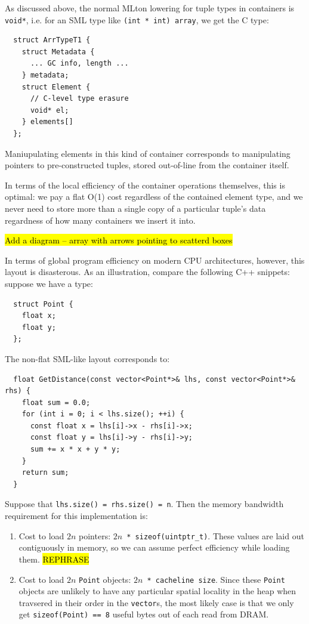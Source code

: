 \documentclass[leqno,11pt]{article}
\begin{document}
As discussed above, the normal MLton lowering for tuple types in containers is
\texttt{void*}, i.e. for an SML type like \texttt{(int * int) array}, we get the
C type:
\begin{verbatim}
  struct ArrTypeT1 {
    struct Metadata {
      ... GC info, length ...
    } metadata;
    struct Element {
      // C-level type erasure
      void* el;
    } elements[]
  };
\end{verbatim}
Maniupulating elements in this kind of container corresponds to manipulating
pointers to pre-constructed tuples, stored out-of-line from the container
itself.

In terms of the local efficiency of the container operations themselves, this is
optimal: we pay a flat O(1) cost regardless of the contained element type, and
we never need to store more than a single copy of a particular tuple's data
regardness of how many containers we insert it into.

\hl{Add a diagram -- array with arrows pointing to scatterd boxes}

In terms of global program efficiency on modern CPU architectures, however, this
layout is disasterous. As an illustration, compare the following C++ snippets:
suppose we have a type:
\begin{verbatim}
  struct Point {
    float x;
    float y;
  };
\end{verbatim}
The non-flat SML-like layout corresponds to:
\begin{verbatim}
  float GetDistance(const vector<Point*>& lhs, const vector<Point*>& rhs) {
    float sum = 0.0;
    for (int i = 0; i < lhs.size(); ++i) {
      const float x = lhs[i]->x - rhs[i]->x;
      const float y = lhs[i]->y - rhs[i]->y;
      sum += x * x + y * y;
    }
    return sum;
  }
\end{verbatim}
Suppose that \texttt{lhs.size() = rhs.size() = n}. Then the memory bandwidth
requirement for this implementation is:
\begin{enumerate}
\item Cost to load $2n$ pointers: \texttt{$2n$ * sizeof(uintptr\_t)}. These
  values are laid out contiguously in memory, so we can assume perfect
  efficiency while loading them. \hl{REPHRASE}
\item Cost to load $2n$ \texttt{Point} objects: \texttt{$2n$ * cacheline size}.
  Since these \texttt{Point} objects are unlikely to have any particular spatial
  locality in the heap when travsered in their order in the \texttt{vector}s,
  the most likely case is that we only get \texttt{sizeof(Point) == 8} useful
  bytes out of each read from DRAM.
\end{enumerate}
\end{document}
